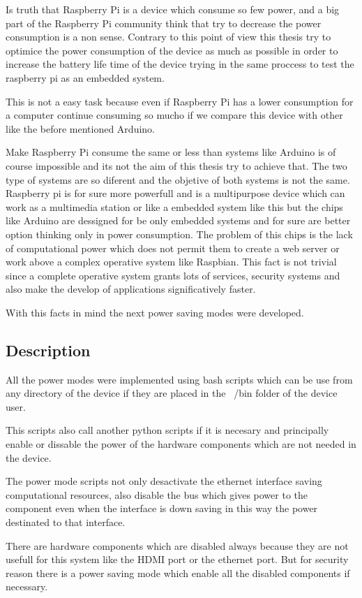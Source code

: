 		Is truth that Raspberry Pi is a device which consume so few power, and a big part of the Raspberry Pi community think that try to decrease the power consumption is a non sense. Contrary to this point of view this thesis try to optimice the power consumption of the device as much as possible in order to increase the battery life time of the device trying in the same proccess to test the raspberry pi as an embedded system.

		This is not a easy task because even if Raspberry Pi has a lower consumption for a computer continue consuming so mucho if we compare this device with other like the before mentioned Arduino.

		Make Raspberry Pi consume the same or less than systems like Arduino is of course impossible and its not the aim of this thesis try to achieve that. The two type of systems are so diferent and the objetive of both systems is not the same. Raspberry pi is for sure more powerfull and is a multipurpose device which can work as a multimedia station or like a embedded system like this but the chips like Arduino are dessigned for be only embedded systems and for sure are better option thinking only in power consumption. The problem of this chips is the lack of computational power which does not permit them to create a web server or work above a complex operative system like Raspbian. This fact is not trivial since a complete operative system grants lots of services, security systems and also make the develop of applications significatively faster.

		With this facts in mind the next power saving modes were developed.
		\subsection{Description}
		All the power modes were implemented using bash scripts which can be use from any directory of the device if they are placed in the ~/bin folder of the device user.

		This scripts also call another python scripts if it is necesary and principally enable or dissable the power of the hardware components which are not needed in the device.

		The power mode scripts not only desactivate the ethernet interface saving computational resources, also disable the bus which gives power to the component even when the interface is down saving in this way the power destinated to that interface.

		There are hardware components which are disabled always because they are not usefull for this system like the HDMI port or the ethernet port. But for security reason there is a power saving mode which enable all the disabled components if necessary.

